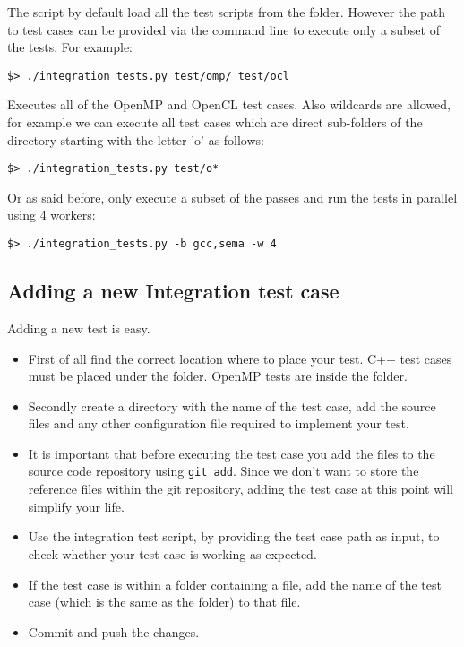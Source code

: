 The script by default load all the test scripts from the  folder.
However the path to test cases can be provided via the command line to execute
only a subset of the tests. For example:

\begin{verbatim}
$> ./integration_tests.py test/omp/ test/ocl
\end{verbatim}

Executes all of the OpenMP and OpenCL test cases. Also wildcards are allowed,
for example we can execute all test cases which are direct sub-folders of the
 directory starting with the letter 'o' as follows:

\begin{verbatim}
$> ./integration_tests.py test/o*
\end{verbatim}

Or as said before, only execute a subset of the passes and run the tests in
parallel using 4 workers:

\begin{verbatim}
$> ./integration_tests.py -b gcc,sema -w 4
\end{verbatim}

\subsection{Adding a new Integration test case} 

Adding a new test is easy. 
\begin{itemize}
	\item First of all find the correct location where to place
		your test. C++ test cases must be placed under the  folder.
		OpenMP tests are inside the  folder. 

	\item Secondly create a directory with the name of the test case, add the
		source files and any other configuration file required to implement your
		test. 

	\item It is important that before executing the test case you add the files
		to the source code repository using {\tt git add}. Since we don't want to
		store the reference files within the git repository, adding the test case
		at this point will simplify your life. 
	
	\item Use the integration test script, by providing the test case path as
		input, to check whether your test case is working as expected.

	\item If the test case is within a folder containing a  file,
		add the name of the test case (which is the same as the folder) to that
		file.

	\item Commit and push the changes. 

\end{itemize}


